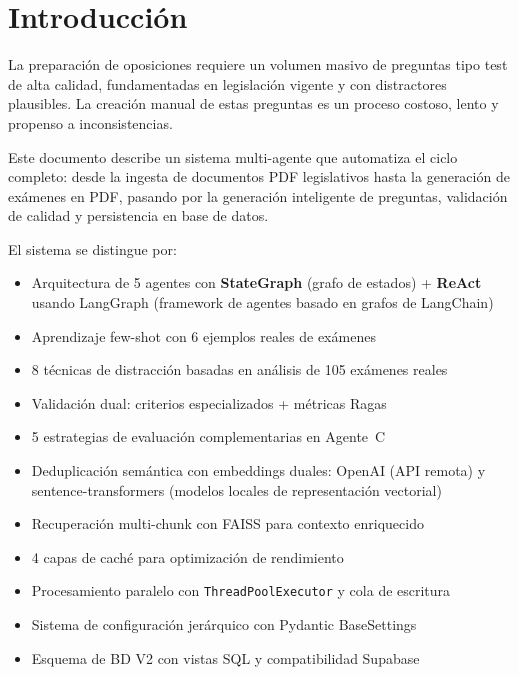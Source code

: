 \documentclass[10pt,twocolumn,letterpaper]{article}
\begin{document}
\section{Introducci\'on}

La preparaci\'on de oposiciones requiere un volumen masivo de preguntas tipo test de alta
calidad, fundamentadas en legislaci\'on vigente y con distractores plausibles. La creaci\'on
manual de estas preguntas es un proceso costoso, lento y propenso a inconsistencias.

Este documento describe un sistema multi-agente que automatiza el ciclo completo:
desde la ingesta de documentos PDF legislativos hasta la generaci\'on de ex\'amenes en PDF,
pasando por la generaci\'on inteligente de preguntas, validaci\'on de calidad y persistencia
en base de datos.

El sistema se distingue por:
\begin{itemize}[nosep,leftmargin=*]
  \item Arquitectura de 5 agentes con \textbf{StateGraph} (grafo de estados) + \textbf{ReAct} usando LangGraph (framework de agentes basado en grafos de LangChain)
  \item Aprendizaje few-shot con 6 ejemplos reales de ex\'amenes
  \item 8 t\'ecnicas de distracci\'on basadas en an\'alisis de 105 ex\'amenes reales
  \item Validaci\'on dual: criterios especializados + m\'etricas Ragas
  \item 5 estrategias de evaluaci\'on complementarias en Agente~C
  \item Deduplicaci\'on sem\'antica con embeddings duales: OpenAI (API remota) y sentence-transformers (modelos locales de representaci\'on vectorial)
  \item Recuperaci\'on multi-chunk con FAISS para contexto enriquecido
  \item 4 capas de cach\'e para optimizaci\'on de rendimiento
  \item Procesamiento paralelo con \texttt{ThreadPoolExecutor} y cola de escritura
  \item Sistema de configuraci\'on jer\'arquico con Pydantic BaseSettings
  \item Esquema de BD V2 con vistas SQL y compatibilidad Supabase
\end{itemize}
\end{document}
